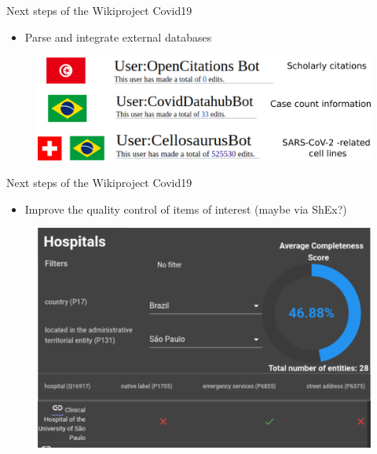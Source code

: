 \documentclass{beamer}
\begin{document}
\begin{frame}{Next steps of the Wikiproject Covid19}
\begin{itemize}
    \item Parse and integrate external databases
\end{itemize}
\begin{figure}
\includegraphics[scale=0.65]{fig/wikidata_covid_19_bots.png}
\end{figure}
\end{frame}

\begin{frame}{Next steps of the Wikiproject Covid19}
\begin{itemize}
    \item Improve the quality control of items of interest (maybe via ShEx?) 
\end{itemize}
\begin{figure}
\includegraphics[scale=0.65]{fig/validation.png}
\end{figure}
\end{frame}
\end{document}
